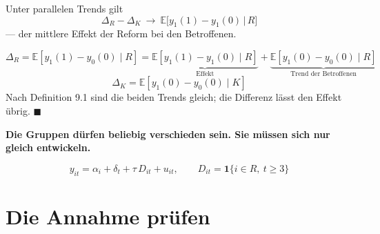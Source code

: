 \begin{merksatz}
Unter parallelen Trends gilt
\[ \Delta_R - \Delta_K \ \longrightarrow\ \mathbb{E}\bigl[y_1(1) - y_1(0)\,\big|\,R\bigr] \]
--- der mittlere Effekt der Reform bei den Betroffenen.

\[ \Delta_R = \mathbb{E}[y_1(1)-y_0(0)\mid R] = \underbrace{\mathbb{E}[y_1(1)-y_1(0)\mid R]}_{\text{Effekt}} + \underbrace{\mathbb{E}[y_1(0)-y_0(0)\mid R]}_{\text{Trend der Betroffenen}} \]
\[ \Delta_K = \mathbb{E}[y_1(0)-y_0(0)\mid K] \]
Nach Definition 9.1 sind die beiden Trends gleich; die Differenz lässt den Effekt übrig. $\blacksquare$

\begin{center}
\begin{minipage}{0.9\textwidth}
\textbf{Die Gruppen dürfen beliebig verschieden sein. Sie müssen sich nur gleich entwickeln.}
\end{minipage}
\end{center}

\[ y_{it} = \alpha_i + \delta_t + \tau\,D_{it} + u_{it}, \qquad D_{it} = \mathbf 1\{i \in R,\ t \ge 3\} \]
\end{merksatz}

\section{Die Annahme prüfen}

